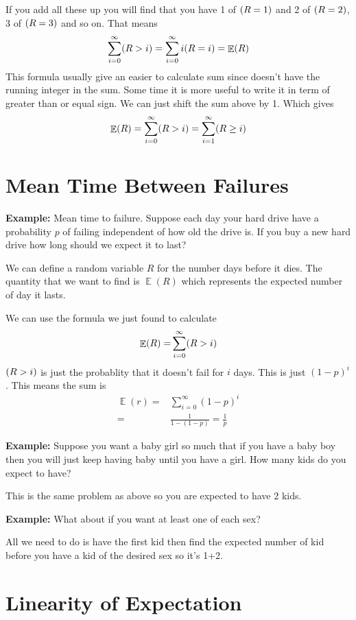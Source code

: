 \documentclass[a4paper, 12pt]{article}
\newcommand{\example}{\vspace{1em}\noindent\textbf{Example:} }
\let\Pr\relax
\DeclareMathOperator{\Pr}{Pr}
\DeclareMathOperator{\E}{\mathbb{E}}
\begin{document}
\begin{multicols}{2}
	If you add all these up you will find that you have 1 of $\Pr(R=1)$ and 2 of $\Pr(R=2)$, 3 of $\Pr(R=3)$ and so on. That means
	\[
	 \sum_{i=0}^{\infty} \Pr(R>i) = \sum_{i=0}^{\infty} i \Pr(R= i) = \E(R)
	\]
	This formula usually give an easier to calculate sum since doesn't have the running integer in the sum. Some time it is more useful to write it in term of greater than or equal sign. We can just shift the sum above by 1. Which gives
	\[
	 \E(R) = \sum_{i=0}^{\infty} \Pr(R>i) = \sum_{i=1}^{\infty} \Pr(R \ge i) 
	\]
	
	\section*{Mean Time Between Failures}
	\example Mean time to failure. Suppose each day your hard drive have a probability $p$ of failing independent of how old the drive is. If you buy a new hard drive how long should we expect it to last?
	
	We can define a random variable $R$ for the number days before it dies. The quantity that we want to find is $\E(R)$ which represents the expected number of day it lasts.
	
	We can use the formula we just found to calculate
	\begin{align*}
		\E(R) =& \sum_{i=0}^{\infty} \Pr(R>i)\\
	\end{align*}
	$\Pr(R>i)$ is just the probablity that it doesn't fail for $i$ days. This is just $(1-p)^i$. This means the sum is 
	\begin{align*}
	\E(r) =& \sum_{i=0}^{\infty} (1-p)^i\\
	=& \frac{1}{1-(1-p)} = \frac{1}{p}
	\end{align*}
	
\example Suppose you want a baby girl so much that if you have a baby boy then you will just keep having baby until you have a girl. How many kids do you expect to have?

This is the same problem as above so you are expected to have 2 kids.

\example What about if you want at least one of each sex?

All we need to do is have the first kid then find the expected number of kid before you have a kid of the desired sex so it's 1+2.


\section*{Linearity of Expectation}


\end{multicols}
\end{document}
